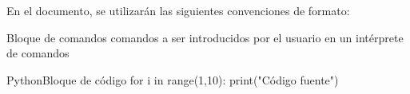 En el documento, se utilizarán las siguientes convenciones de formato:

    \begin{TMterminal}{}{}{Bloque de comandos}
      comandos a ser introducidos por el usuario en un intérprete de comandos
    \end{TMterminal}

    \begin{TMcode}{Python}{}{Bloque de código}
      for i in range(1,10):
          print("Código fuente")
    \end{TMcode}
\clearpage
